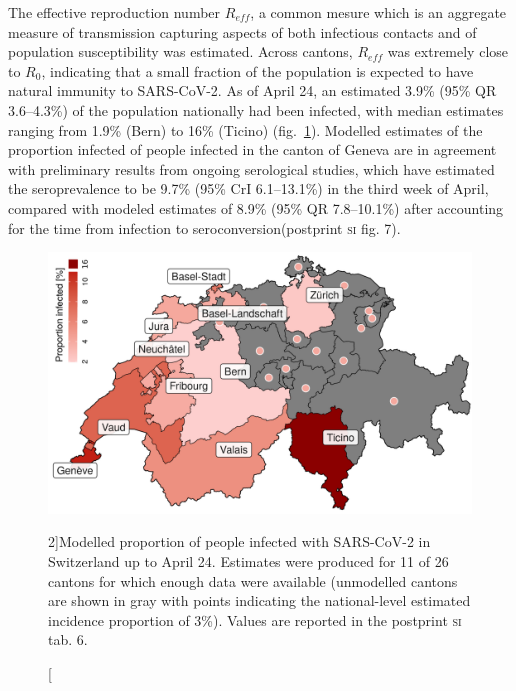 The effective reproduction number $R_{eff}$, a common mesure which is an aggregate measure of transmission capturing aspects of both infectious contacts and of population susceptibility was estimated. Across cantons, $R_{eff}$ was extremely close to $R_0$, indicating that a small fraction of the population is expected to have natural immunity to SARS-CoV-2. 
As of April 24, an estimated 3.9\% (95\% QR 3.6–4.3\%) of the population nationally had been infected, with median estimates ranging from 1.9\% (Bern) to 16\% (Ticino) (fig.~\ref{fig:covid-ch-map}). 
Modelled estimates of the proportion infected of people infected in the canton of Geneva are in agreement with preliminary results from ongoing serological studies, which have estimated the seroprevalence to be 9.7\% (95\% CrI 6.1–13.1\%) in the third week of April\cite[-3\baselineskip]{Stringhini:RepeatedSeroprevalenceAntiSARSCoV2:2020}, compared with modeled estimates of 8.9\% (95\% QR 7.8–10.1\%) after accounting for the time from infection to seroconversion\cite{Wolfel:VirologicalAssessmentHospitalized:2020}(postprint \textsc{si} fig. 7).

\begin{figure}\centering
  \includegraphics[width=\textwidth]{fig_covid-switzerland-npi/FIGURE_5_mod.png}
  \caption[Modelled proportion of people infected with SARS-CoV-2 in Switzerland][2\baselineskip]{Modelled proportion of people infected with SARS-CoV-2 in Switzerland up to April 24. Estimates were produced for 11 of 26 cantons for which enough data were available (unmodelled cantons are shown in gray with points indicating the national-level estimated incidence proportion of 3\%). Values are reported in the postprint \textsc{si} tab. 6.}
  \label{fig:covid-ch-map}
\end{figure}

